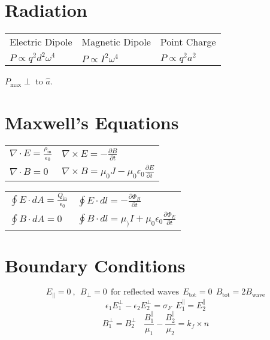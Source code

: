 \documentclass[10pt,letter]{article}
\begin{document}
\section{Radiation} %
\label{sec:radiation}
\begin{tabular}{l l l}
Electric Dipole & Magnetic Dipole & Point Charge\\
$P \propto q^2 d^2 \omega^4$ & $P\propto I^2 \omega^4$ & $P \propto q^2 a^2$
\end{tabular}

$P_{\textrm{max}} \perp$ to $\hat{a}$.

\section{Maxwell's Equations} %
\label{sec:maxwell_s_equations}
\begin{tabular}{l l}
$\nabla \cdot E = \frac{\rho_{\textrm{in}}}{\epsilon_0}$ & $\nabla \times E = - \frac{\partial B}{\partial t}$\\
$\nabla \cdot B = 0$ & $\nabla \times B = \mu_0 J - \mu_0 \epsilon_0 \frac{\partial E}{\partial t}$
\end{tabular}

\begin{tabular}{ll}
$\oint E \cdot dA = \frac{Q_{\textrm{in}}}{\epsilon_0}$ & $\oint E \cdot dl = - \frac{\partial \Phi_B}{\partial t}$\\
$\oint B \cdot dA = 0$ & $\oint B \cdot dl = \mu_) I + \mu_0 \epsilon_0 \frac{\partial \Phi_E}{\partial t}$
\end{tabular}

\section{Boundary Conditions} %
\label{sec:boundary_conditions}
\begin{equation}
    E_\parallel = 0~,~~ B_\perp = 0~~\textrm{for reflected waves}~~ E_{\textrm{tot}}=0~~ B_{\textrm{tot}} = 2B_{\textrm{wave}}
\end{equation}
\begin{equation}
    \epsilon_1 E_1^\perp - \epsilon_2 E_2^\perp = \sigma_F~~E_1^\parallel = E_2^\parallel
\end{equation}
\begin{equation}
    B_1 ^\perp = B_2^\perp ~~~~ \frac{B_1^\parallel}{\mu_1} - \frac{B_2^\parallel}{\mu_2} = k_f \times \hat{n}
\end{equation}
\end{document}
